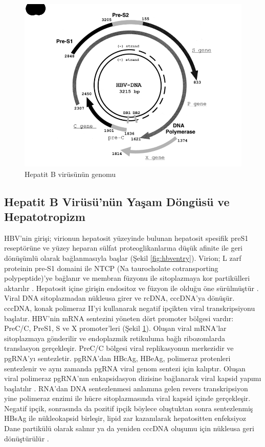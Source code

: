 \bigskip

\begin{figure}[tbph]
\centering
\includegraphics[width=0.7\linewidth]{../Figures/hbvgenom}
\caption[Hepatit B virüsünün genomu]{Hepatit B virüsünün genomu \cite{inoue2016hepatitis}}
\label{fig:hbvgenom}
\end{figure}

\subsection{Hepatit B Virüsü'nün Yaşam Döngüsü ve Hepatotropizm}


HBV'nin girişi; virionun hepatosit yüzeyinde bulunan hepatosit spesifik preS1 reseptörüne ve yüzey heparan sülfat proteoglikanlarına düşük afinite ile geri dönüşümlü olarak bağlanmasıyla başlar (Şekil \ref{fig:hbventry}). Virion; L zarf proteinin pre-S1 domaini ile NTCP (Na taurocholate cotransporting polypeptide)'ye bağlanır ve membran füzyonu ile sitoplazmaya kor partikülleri aktarılır \cite{yan2012sodium, watashi2014ntcp}. Hepatosit içine girişin endositoz ve füzyon ile olduğu öne sürülmüştür \cite{urban2010replication}. Viral DNA sitoplazmadan nükleusa girer ve rcDNA, cccDNA'ya dönüşür. cccDNA, konak polimeraz II'yi kullanarak negatif ipçikten viral transkripsiyonu başlatır. HBV'nin mRNA sentezini yöneten dört promoter bölgesi vardır: PreC/C, PreS1, S ve X promoter'leri (Şekil \ref{fig:hbvgenom}). Oluşan viral mRNA'lar sitoplazmaya gönderilir ve endoplazmik retikuluma bağlı ribozomlarda translasyon gerçekleşir. PreC/C bölgesi viral replikasyonun merkezidir ve pgRNA'yı sentezletir. pgRNA'dan HBcAg, HBeAg, polimeraz protenleri sentezlenir ve aynı zamanda pgRNA viral genom sentezi için kalıptır. Oluşan viral polimeraz pgRNA'nın enkapsidasyon dizisine bağlanarak viral kapsid yapımı başlatılır \cite{jeong2000evidence}. RNA'dan DNA sentezlenmesi anlamına gelen revers transkripsiyon yine polimeraz enzimi ile hücre sitoplazmasında viral kapsid içinde gerçekleşir. Negatif ipçik, sonrasında da pozitif ipçik böylece oluştuktan sonra sentezlenmiş HBsAg ile nükleokapsid birleşir, lipid zar kazanılarak hepatositten enfeksiyoz Dane partikülü olarak salınır ya da yeniden cccDNA oluşumu için nükleusa geri dönüştürülür \cite{yang2014persistence}.

